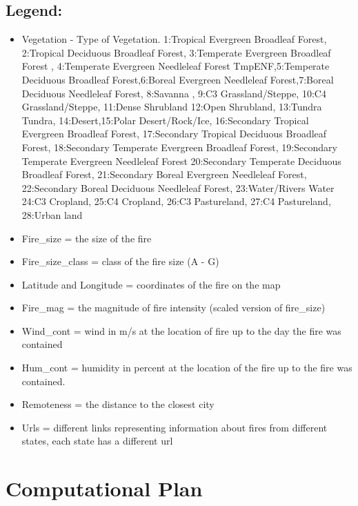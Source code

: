 \documentclass[fontsize=11pt]{article}
\begin{document}
\subsection*{Legend:}
\begin{itemize}
    \item Vegetation - Type of Vegetation.
    1:Tropical Evergreen Broadleaf Forest, 2:Tropical Deciduous Broadleaf Forest, 3:Temperate Evergreen Broadleaf Forest ,
4:Temperate Evergreen Needleleaf Forest TmpENF,5:Temperate Deciduous Broadleaf Forest,6:Boreal Evergreen Needleleaf Forest,7:Boreal Deciduous Needleleaf Forest, 8:Savanna , 9:C3 Grassland/Steppe, 10:C4 Grassland/Steppe, 11:Dense Shrubland 12:Open Shrubland, 13:Tundra Tundra, 14:Desert,15:Polar Desert/Rock/Ice, 16:Secondary Tropical Evergreen Broadleaf Forest, 17:Secondary Tropical Deciduous Broadleaf Forest, 18:Secondary Temperate Evergreen Broadleaf Forest, 19:Secondary Temperate Evergreen Needleleaf Forest
20:Secondary Temperate Deciduous Broadleaf Forest, 21:Secondary Boreal Evergreen Needleleaf Forest, 22:Secondary Boreal Deciduous Needleleaf Forest, 23:Water/Rivers Water
24:C3 Cropland, 25:C4 Cropland, 26:C3 Pastureland, 27:C4 Pastureland, 28:Urban land
\item Fire\_size = the size of the fire \item Fire\_size\_class = class of the fire size (A - G)
\item Latitude and Longitude = coordinates of the fire on the map
\item Fire\_mag = the magnitude of fire intensity (scaled version of fire\_size)
\item Wind\_cont = wind in m/s at the location of fire up to the day the fire was contained
\item Hum\_cont = humidity in percent at the location of the fire up to the fire was contained.
\item Remoteness = the distance to the closest city
\item Urls = different links representing information about fires from different states, each state has a different url
\end{itemize}

\pagebreak

\section*{Computational Plan}
\end{document}
